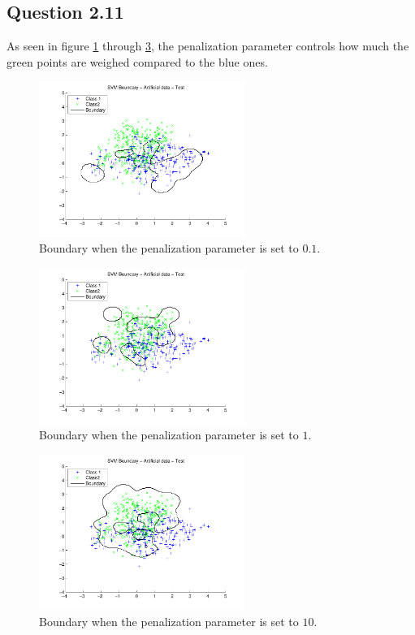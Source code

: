 \subsection*{Question 2.11}

As seen in figure \ref{fig:q211.1} through \ref{fig:q211.3}, the penalization parameter controls how much the green points are weighed compared to the blue ones.

\begin{figure}[!htbp]
  \centering
  \includegraphics[width=0.6\textwidth]{./images/q211_0_1.pdf}
  \caption{Boundary when the penalization parameter is set to $0.1$.}
  \label{fig:q211.1}
\end{figure}
\begin{figure}[!htbp]
  \centering
  \includegraphics[width=0.6\textwidth]{./images/q211_01.pdf}
  \caption{Boundary when the penalization parameter is set to $1$.}
  \label{fig:q211.2}
\end{figure}
\begin{figure}[!htbp]
  \centering
  \includegraphics[width=0.6\textwidth]{./images/q211_10.pdf}
  \caption{Boundary when the penalization parameter is set to $10$.}
  \label{fig:q211.3}
\end{figure}

